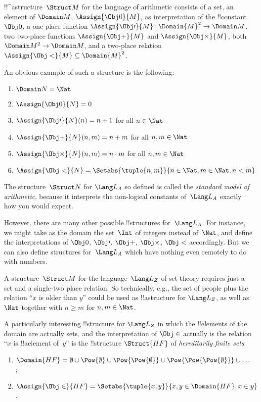 \documentclass[../../include/open-logic-section]{subfiles}
\begin{document}
\begin{ex}
!!^a{structure}~$\Struct M$ for the language of arithmetic consists of a
  set, an element of $\Domain M$, $\Assign{\Obj 0}{M}$, as
  interpretation of the !!{constant}~$\Obj 0$, a one-place function
  $\Assign{\Obj \prime}{M} \colon \Domain{M}^2 \to \Domain M$, two
  two-place functions $\Assign{\Obj +}{M}$ and $\Assign{\Obj
    \times}{M}$, both $\Domain M^2 \to \Domain M$, and a two-place
  relation $\Assign{\Obj <}{M} \subseteq \Domain{M}^2$.

An obvious example of such a structure is the following:
\begin{enumerate}
\item $\Domain N = \Nat$
\item $\Assign{\Obj 0}{N} = 0$
\item $\Assign{\Obj \prime}{N}(n) = n + 1$ for all $n \in \Nat$
\item $\Assign{\Obj +}{N}(n, m) = n + m$ for all $n, m \in \Nat$
\item $\Assign{\Obj \times}{N}(n, m) = n\cdot m$ for all $n, m \in \Nat$
\item $\Assign{\Obj <}{N} = \Setabs{\tuple{n, m}}{n \in \Nat, m \in
  \Nat, n < m}$
\end{enumerate}
The structure~$\Struct N$ for $\Lang L_A$ so defined is called the
\emph{standard model of arithmetic}, because it interprets the
non-logical constants of~$\Lang L_A$ exactly how you would expect.

However, there are many other possible !!{structure}s for~$\Lang
L_A$. For instance, we might take as the domain the set~$\Int$ of
integers instead of~$\Nat$, and define the interpretations of $\Obj
0$, $\Obj \prime$, $\Obj +$, $\Obj \times$, $\Obj <$ accordingly.  But
we can also define structures for~$\Lang L_A$ which have nothing even
remotely to do with numbers. 
\end{ex}

\begin{ex}
A structure~$\Struct M$ for the language~$\Lang L_Z$ of set theory requires
just a set and a single-two place relation. So technically, e.g., the
set of people plus the relation ``$x$ is older than $y$'' could be
used as !!a{structure} for $\Lang L_Z$, as well as $\Nat$ together
with $n \ge m$ for $n, m \in \Nat$.

A particularly interesting !!{structure} for $\Lang L_Z$ in which the
!!{element}s of the domain are actually sets, and the interpretation
of $\Obj \in$ actually is the relation ``$x$ is !!a{element} of~$y$''
is the !!{structure} $\Struct{{HF}}$ of \emph{hereditarily finite sets}:
\begin{enumerate}
\item $\Domain{{{HF}}} = \emptyset \cup \Pow{\emptyset} \cup
  \Pow{\Pow{\emptyset}} \cup \Pow{\Pow{\Pow{\emptyset}}} \cup \dots$;
\item $\Assign{\Obj \in}{{{HF}}} = \Setabs{\tuple{x, y}}{x, y \in
  \Domain{{{HF}}}, x \in y}$.
\end{enumerate}
\end{ex}
\end{document}
